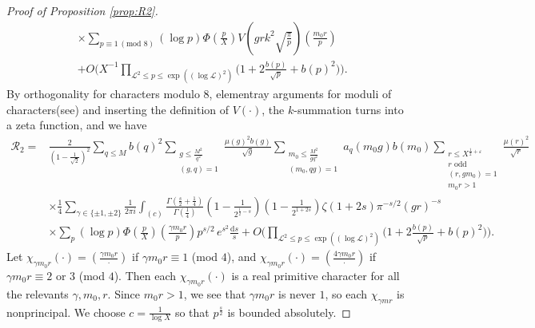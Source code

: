 \documentclass[12pt,reqno]{amsart}
\numberwithin{equation}{section}
\theoremstyle{plain}
\theoremstyle{definition}
\theoremstyle{remark}
\newcommand{\dd}{\mathrm{d}}
\begin{document}
\begin{proof}[Proof of Proposition \ref{prop:R2}]
\begin{align*}
    &\times\sum_{p\equiv 1 \, (\text{mod }8) } (\log p) \Phi\left(\frac{p}{X}\right)V\left( grk^2\sqrt{\frac{\pi}{p}}\right) \left(\frac{m_0r}{p}\right) \\
    &+ O\bigg(X^{-1}\prod_{\mathcal{L}^2\leq p \leq \exp((\log \mathcal{L})^2)}\bigg(1+2\frac{b(p)}{\sqrt{p}}+b(p)^2\bigg)\bigg).
\end{align*}
By orthogonality for characters modulo 8, elementray arguments for moduli of characters(see\cite[Theorem 2.2.15]{Co07}) and inserting the definition of $V(\cdot)$, the $k$-summation turns into a zeta function, and we have
\begin{equation}\label{eq: pretreatment of R2 1}
  \begin{split}
  \mathcal{R}_2=& \frac{2}{\left( 1-\frac{1}{\sqrt{2}}\right)^2} \sum_{q\leq M} b(q)^2 \sum_{\substack{g\leq \frac{M^2}{q^2}\\ (g,q)=1}} \frac{{\mu (g)}^2b(g)}{ \sqrt{g}} \sum_{\substack{m_0 \leq \frac{M^2}{gq^2} \\ (m_0,qg)=1}} a_q(m_0g) b(m_0)\sum_{\substack{r \leq X^{\frac{1}{2}+\varepsilon } \\ r \text{ odd} \\ (r,gm_0)=1 \\ m_0r>1}}\frac{{\mu (r)}^2}{ \sqrt{r}}   \\
  &\times \frac{1}{4} \sum_{\gamma \in \{\pm 1, \pm 2\}} \frac{1}{2\pi i} \int_{(c)} \frac{\Gamma(\frac{s}{2}+\frac{1}{4})}{\Gamma(\frac{1}{4})} \left( 1-\frac{1}{2^{\frac{1}{2}-s}}\right)\left(1 - \frac{1}{2^{1+2s}}\right)\zeta(1+2s)\pi^{-s/2} \left( gr\right)^{-s} \\
  &\times \sum_{p } (\log p) \Phi\left(\frac{p}{X}\right)  \left(\frac{\gamma m_0r}{p}\right) p^{s/2} \, e^{s^2}\frac{\dd s}{s}+O\bigg(\prod_{\mathcal{L}^2\leq p \leq \exp((\log \mathcal{L})^2)}\bigg(1+2\frac{b(p)}
  {\sqrt{p}}+b(p)^2\bigg)\bigg) .
  \end{split}
\end{equation}
Let $\chi_{\gamma m_0r}(\cdot)=\left(\frac{\gamma m_0r}{\cdot }\right)$ if $\gamma m_0r \equiv 1$ (mod $4$), and $\chi_{\gamma m_0r}(\cdot)=\left(\frac{4\gamma m_0r}{\cdot }\right)$ if $\gamma m_0r\equiv 2$ or $3$ (mod $4$).
Then each $\chi_{\gamma m_0r}(\cdot)$ is a real primitive character for all the relevants $\gamma,m_0,r$.
Since $m_0r>1$, we see that $\gamma m_0r$ is never $1$, so each $\chi_{\gamma mr}$ is nonprincipal.
We choose $c=\frac{1}{\log X}$ so that $p^{\frac{s}{2}}$ is bounded absolutely.


\end{proof}
\end{document}
